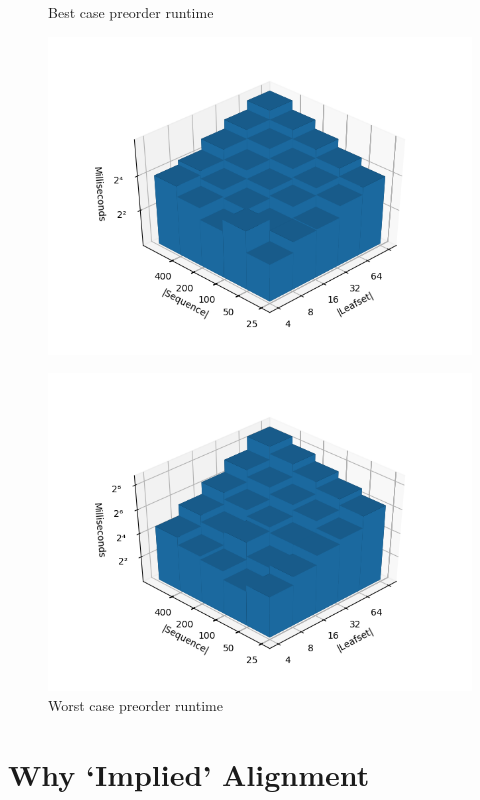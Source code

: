 \documentclass[11pt]{article}
\begin{document}
\begin{figure}[h]
\begin{minipage}{0.49\textwidth}
\centering
\caption{Best case preorder runtime}
\label{Fig:Best}
\includegraphics[width=1.05\textwidth]{pathological-12-preorder.png}
\end{minipage}
\hfill
\begin{minipage}{0.49\textwidth}
\centering
\caption{Worst case preorder runtime}
\label{Fig:Worst}
\includegraphics[width=1.05\textwidth]{pathological-31-preorder.png}
\end{minipage}
\end{figure}


\section{Why `Implied' Alignment}
\end{document}
